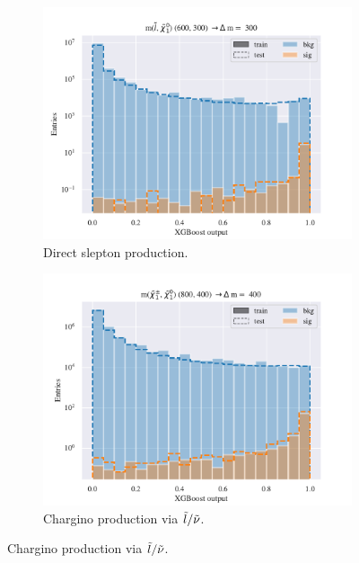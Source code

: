 \begin{figure}[H]
    \centering
    \begin{subfigure}[t!]{0.49\textwidth}
        \includegraphics[width = \textwidth]{Figures/SlepSlep/ML/BDT/Low_level/Inter/scaled_train_test_396014.pdf}
        \caption{Direct slepton production.}
        \label{fig:}
    \end{subfigure}
    \begin{subfigure}[t!]{0.49\textwidth}
        \includegraphics[width = \textwidth]{Figures/SlepSnu/BDT/Low_level/Inter/scaled_train_test_397150.pdf}
        \caption{Chargino production via $\Tilde{l}/\Tilde{\nu}$.}
        \label{fig:}
    \end{subfigure}

\end{figure}

